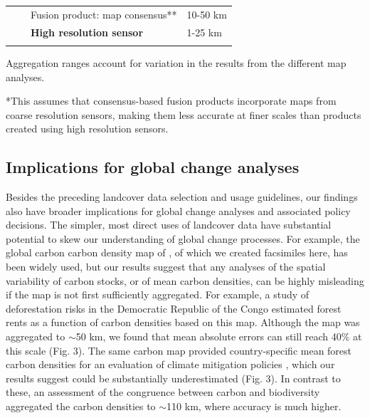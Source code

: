 \documentclass{pnastwo}
\begin{document}
\begin{article}
\begin{table}[!h]
\begin{threeparttable}
\begin{center}
\begin{tabular}{p{4.5cm}lp{6cm}l}
                                                             &                                   & Fusion product: map consensus** & 10-50 km\\
                                                              &                                   & \textbf{High resolution sensor} & 1-25 km\\
\Xhline{1pt}                         
       \end{tabular}
       \begin{tablenotes}
        \small
        \item *Aggregation ranges account for variation in the results from the different map analyses.
        \item **This assumes that consensus-based fusion products \cite[e.g.][]{fritz_cropland_2011,fritz_mapping_2015,tuanmu_global_2014} incorporate maps from coarse resolution sensors, making them less accurate at finer scales than products created using high resolution sensors.
       \end{tablenotes}
     \end{center}
     \label{default}
  \end{threeparttable}
\end{table}%


\subsection{Implications for global change analyses}
Besides the preceding landcover data selection and usage guidelines, our findings also have broader implications for global change analyses and associated policy decisions. The simpler, most direct uses of landcover data have substantial potential to skew our understanding of global change processes. For example, the global carbon carbon density map of \cite{ruesch_new_2008}, of which we created facsimiles here, has been widely used, but our results suggest that any analyses of the spatial variability of carbon stocks, or of mean carbon densities, can be highly misleading if the map is not first sufficiently aggregated. For example, a study of deforestation risks in the Democratic Republic of the Congo estimated forest rents as a function of carbon densities based on this map. Although the map was aggregated to $\sim$50 km, we found that mean absolute errors can still reach 40\% at this scale (Fig. 3). The same carbon map provided country-specific mean forest carbon densities for an evaluation of climate mitigation policies \cite{cattaneo_international_2010}, which our results suggest could be substantially underestimated (Fig. 3). In contrast to these, an assessment of the congruence between carbon and biodiversity \cite{strassburg_global_2010} aggregated the carbon densities to $\sim$110 km, where accuracy is much higher. 


\end{article}
\end{document}

